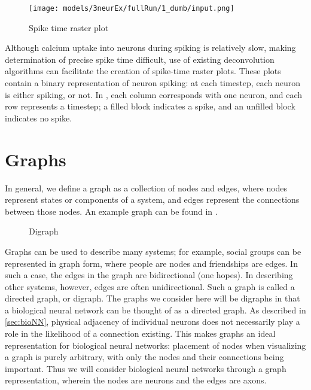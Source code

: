 \begin{wrapfigure}[8]{r}{.25\textwidth}
	\centering
	\vspace{-14pt}
	\texttt{[image: models/3neurEx/fullRun/1\_dumb/input.png]}
	\captionsetup{width=.85\linewidth}
	\caption{Spike time raster plot}
	\label{fig:rasterplot}
\end{wrapfigure}
Although calcium uptake into neurons during spiking is relatively slow, making 
determination of precise spike time difficult, use of existing deconvolution 
algorithms can facilitate the creation of spike-time raster plots\cite{Xu8025}.  
These plots contain a binary representation of neuron spiking: at each timestep, 
each neuron is either spiking, or not. In , each column 
corresponds with one neuron, and each row represents a timestep; a filled block 
indicates a spike, and an unfilled block indicates no spike.


\section{Graphs}
In general, we define a graph as a collection of nodes and edges, where nodes 
represent states or components of a system, and edges represent the connections 
between those nodes\cite{networksciencebook}. An example graph can be found in 
.

\begin{wrapfigure}[6]{l}{.28\textwidth}
	\centering
	\vspace{-5pt}
	
	\caption{Digraph}
	\label{fig:digraph}
\end{wrapfigure}
\noindent Graphs can be used to describe many systems; for example, social 
groups can be represented in graph form, where people are nodes and friendships 
are edges.  In such a case, the edges in the graph are bidirectional (one 
hopes). In describing other systems, however, edges are often unidirectional.  
Such a graph is called a directed graph, or digraph.\cite{networksciencebook} 
The graphs we consider here will be digraphs in that a biological neural network 
can be thought of as a directed graph. As described in \ref{sec:bioNN}, physical 
adjacency of individual neurons does not necessarily play a role in the 
likelihood of a connection existing. This makes graphs an ideal representation 
for biological neural networks: placement of nodes when visualizing a graph is 
purely arbitrary, with only the nodes and their connections being important.  
Thus we will consider biological neural networks through a graph representation, 
wherein the nodes are neurons and the edges are axons.

